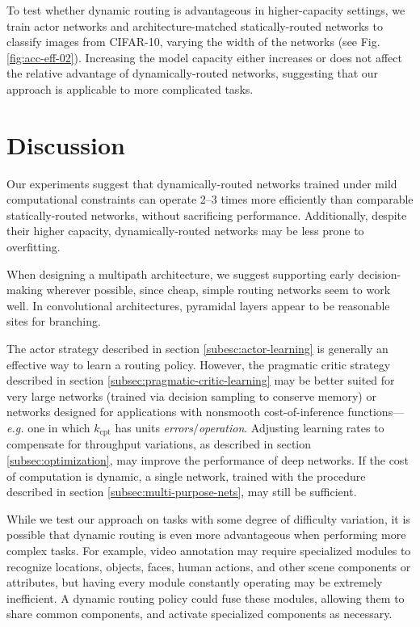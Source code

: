 \documentclass{article}
\begin{document}
  To test whether dynamic routing is advantageous in higher-capacity settings, we train actor networks and architecture-matched statically-routed networks to classify images from CIFAR-10, varying the width of the networks (see Fig. \ref*{fig:acc-eff-02}). Increasing the model capacity either increases or does not affect the relative advantage of dynamically-routed networks, suggesting that our approach is applicable to more complicated tasks.

  \section{Discussion}
  
  Our experiments suggest that dynamically-routed networks trained under mild computational constraints can operate 2--3 times more efficiently than comparable statically-routed networks, without sacrificing performance. Additionally, despite their higher capacity, dynamically-routed networks may be less prone to overfitting.
  
  When designing a multipath architecture, we suggest supporting early decision-making wherever possible, since cheap, simple routing networks seem to work well. In convolutional architectures, pyramidal layers appear to be reasonable sites for branching.
  
  The actor strategy described in section \ref*{subesc:actor-learning} is generally an effective way to learn a routing policy. However, the pragmatic critic strategy described in section \ref*{subsec:pragmatic-critic-learning} may be better suited for very large networks (trained via decision sampling to conserve memory) or networks designed for applications with nonsmooth cost-of-inference functions---\textit{e.g.} one in which $k_\text{cpt}$ has units \textit{errors$/$operation}. Adjusting learning rates to compensate for throughput variations, as described in section \ref*{subsec:optimization}, may improve the performance of deep networks. If the cost of computation is dynamic, a single network, trained with the procedure described in section \ref*{subsec:multi-purpose-nets}, may still be sufficient.
  
  While we test our approach on tasks with some degree of difficulty variation, it is possible that dynamic routing is even more advantageous when performing more complex tasks. For example, video annotation may require specialized modules to recognize locations, objects, faces, human actions, and other scene components or attributes, but having every module constantly operating may be extremely inefficient. A dynamic routing policy could fuse these modules, allowing them to share common components, and activate specialized components as necessary.
  
\end{document}
